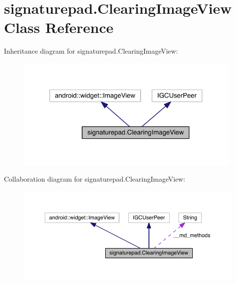 \hypertarget{classsignaturepad_1_1_clearing_image_view}{\section{signaturepad.\+Clearing\+Image\+View Class Reference}
\label{classsignaturepad_1_1_clearing_image_view}
}


Inheritance diagram for signaturepad.\+Clearing\+Image\+View\+:
\nopagebreak
\begin{figure}[H]
\begin{center}
\leavevmode
\includegraphics[width=312pt]{classsignaturepad_1_1_clearing_image_view__inherit__graph}
\end{center}
\end{figure}


Collaboration diagram for signaturepad.\+Clearing\+Image\+View\+:
\nopagebreak
\begin{figure}[H]
\begin{center}
\leavevmode
\includegraphics[width=350pt]{classsignaturepad_1_1_clearing_image_view__coll__graph}
\end{center}
\end{figure}
